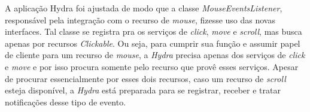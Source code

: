 A aplicação Hydra foi ajustada de modo que a classe \emph{MouseEventsListener}, responsável pela integração com o recurso de \emph{mouse}, fizesse uso das novas interfaces. Tal classe se registra pra os serviços de \emph{click}, \emph{move} e \emph{scroll}, mas busca apenas por recursos \emph{Clickable}. Ou seja, para cumprir sua função e assumir papel de cliente para um recurso de \emph{mouse}, a \emph{Hydra} precisa apenas dos serviços de \emph{click} e \emph{move} e por isso procura somente pelo recurso que provê esses serviços. Apesar de procurar essencialmente por esses dois recursos, caso um recurso de \emph{scroll} esteja disponível, a \emph{Hydra} está preparada para se registrar, receber e tratar notificações desse tipo de evento.
 
